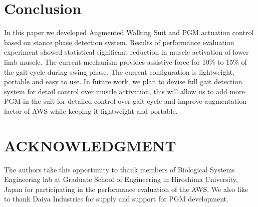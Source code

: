 \documentclass[letterpaper, 10 pt, conference]{ieeeconf}  %
\begin{document}
\section{Conclusion} \label{conclusion}

In this paper we developed Augmented Walking Suit and PGM actuation control based on stance phase detection system. Results of performance evaluation experiment showed statistical significant reduction in muscle activation of lower limb muscle. The current mechanism provides assistive force for 10\% to 15\% of the gait cycle during swing phase. The current configuration is lightweight, portable and easy to use. In future work, we plan to devise full gait detection system for detail control over muscle activation, this will allow us to add more PGM in the suit for detailed control over gait cycle and improve augmentation factor of AWS while keeping it lightweight and portable.

\addtolength{\textheight}{-12cm}   %








\section*{ACKNOWLEDGMENT}

The authors take this opportunity to thank members of Biological Systems Engineering lab at Graduate School of Engineering in Hiroshima University, Japan for participating in the performance evaluation of the AWS. We also like to thank Daiya Industries for supply and support for PGM development.  
\end{document}
